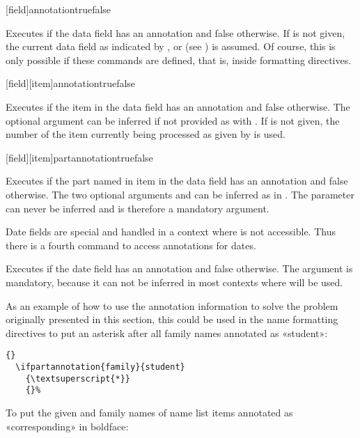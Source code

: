 \documentclass{ltxdockit}[2011/03/25]
\begin{document}
\begin{ltxsyntax}

[field]{annotation}{true}{false}

Executes  if the data field  has an annotation  and false otherwise. If  is not given, the current data field as indicated by ,  or  (see ) is assumed. Of course, this is only possible if these commands are defined, that is, inside formatting directives.

[field][item]{annotation}{true}{false}

Executes  if the item  in the data field  has an annotation  and false otherwise. The optional argument  can be inferred if not provided as with . If  is not given, the number of the item currently being processed as given by  is used.

[field][item]{part}{annotation}{true}{false}

Executes  if the part named  in item  in the data field  has an annotation  and false otherwise. The two optional arguments  and  can be inferred as in . The parameter  can never be inferred and is therefore a mandatory argument.

Date fields are special and handled in a context where  is not accessible. Thus there is a fourth command to access annotations for dates.


Executes  if the date field  has an annotation  and false otherwise. The  argument is mandatory, because it can not be inferred in most contexts where  will be used.

\end{ltxsyntax}
%
As an example of how to use the annotation information to solve the problem originally presented in this section, this could be used in the name formatting directives to put an asterisk after all family names annotated as «student»:

\begin{lstlisting}[style=latex]{}
  \ifpartannotation{family}{student}
    {\textsuperscript{*}}
    {}%
\end{lstlisting}
%
To put the given and family names of name list items annotated as «corresponding» in boldface:
\end{document}
